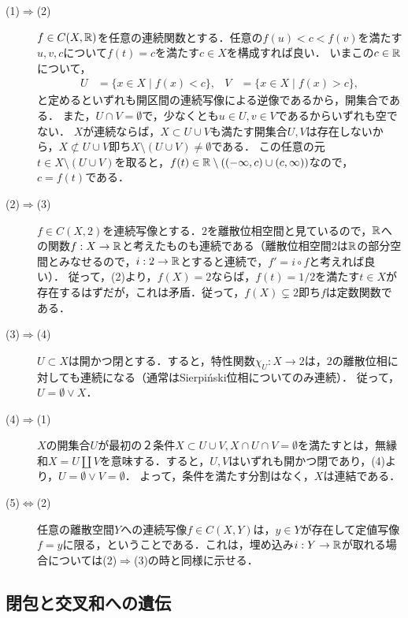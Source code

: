 \documentclass[uplatex,dvipdfmx]{jsreport}
\begin{document}
\begin{Proof}
    \begin{description}
        \item[(1)$\Rightarrow$(2)] 
        $f\in C(X,\mathbb{R})$を任意の連続関数とする．任意の$f(u)<c<f(v)$を満たす$u,v,c$について$f(t)=c$を満たす$c\in X$を構成すれば良い．
        いまこの$c\in\mathbb{R}$について，
        \begin{align*}
            U&=\{x\in X\mid f(x)<c\},&V&=\{x\in X\mid f(x)>c\},
        \end{align*}
        と定めるといずれも開区間の連続写像による逆像であるから，開集合である．
        また，$U\cap V=\emptyset$で，少なくとも$u\in U,v\in V$であるからいずれも空でない．
        $X$が連続ならば，$X\subset U\cup V$も満たす開集合$U,V$は存在しないから，$X\not\subset U\cup V$即ち$X\setminus(U\cup V)\ne\emptyset$である．
        この任意の元$t\in X\setminus(U\cup V)$を取ると，$f(t)\in\mathbb{R}\setminus((-\infty,c)\cup(c,\infty))$なので，
        $c=f(t)$である．
        \item[(2)$\Rightarrow$(3)]
        $f\in C(X,2)$を連続写像とする．$2$を離散位相空間と見ているので，$\mathbb{R}$への関数$f:X\to\mathbb{R}$と考えたものも連続である（離散位相空間$2$は$\mathbb{R}$の部分空間とみなせるので，$i:2\to\mathbb{R}$とすると連続で，$f'=i\circ f$と考えれば良い）．
        従って，(2)より，$f(X)=2$ならば，$f(t)=1/2$を満たす$t\in X$が存在するはずだが，これは矛盾．従って，$f(X)\subsetneq 2$即ち$f$は定数関数である．
        \item[(3)$\Rightarrow$(4)]
        $U\subset X$は開かつ閉とする．すると，特性関数$\chi_U:X\to 2$は，$2$の離散位相に対しても連続になる（通常はSierpiński位相についてのみ連続）．
        従って，$U=\emptyset\lor X$．
        \item[(4)$\Rightarrow$(1)]
        $X$の開集合$U$が最初の２条件$X\subset U\cup V,X\cap U\cap V=\emptyset$を満たすとは，無縁和$X=U\coprod V$を意味する．すると，$U,V$はいずれも開かつ閉であり，(4)より，$U=\emptyset\lor V=\emptyset$．
        よって，条件を満たす分割はなく，$X$は連結である．
        \item[(5)$\Leftrightarrow$(2)]
        任意の離散空間$Y$への連続写像$f\in C(X,Y)$は，$y\in Y$が存在して定値写像$f=y$に限る，ということである．これは，埋め込み$i:Y\to\mathbb{R}$が取れる場合については(2)$\Rightarrow$(3)の時と同様に示せる．
    \end{description}
\end{Proof}

\subsection{閉包と交叉和への遺伝}
\end{document}
